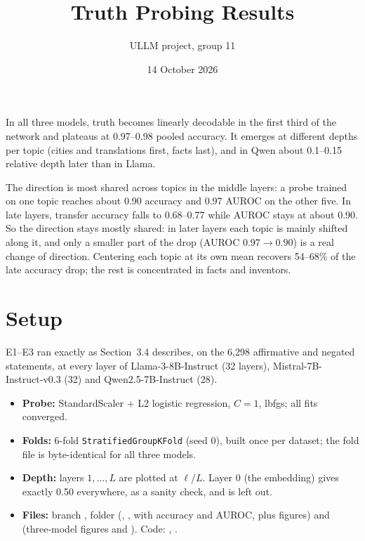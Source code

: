 \documentclass[11pt]{article}
\title{Truth Probing Results}
\author{ULLM project, group 11}
\date{14 October 2026}
\begin{document}
\maketitle

In all three models, truth becomes linearly decodable in the first third of the
network and plateaus at 0.97--0.98 pooled accuracy. It emerges at different depths per
topic (cities and translations first, facts last), and in Qwen about 0.1--0.15 relative
depth later than in Llama.

The direction is most shared across topics in the middle layers: a probe trained on one
topic reaches about 0.90 accuracy and 0.97 AUROC on the other five. In late layers,
transfer accuracy falls to 0.68--0.77 while AUROC stays at about 0.90. So the direction
stays mostly shared: in later layers each topic is mainly shifted along it, and only a
smaller part of the drop (AUROC $0.97 \rightarrow 0.90$) is a real change of direction.
Centering each topic at its own mean recovers 54--68\% of the late accuracy drop; the
rest is concentrated in facts and inventors.

\section{Setup}

E1--E3 ran exactly as Section~3.4 describes, on the 6,298 affirmative and negated
statements, at every layer of Llama-3-8B-Instruct (32 layers), Mistral-7B-Instruct-v0.3
(32) and Qwen2.5-7B-Instruct (28).

\begin{itemize}
  \item \textbf{Probe:} StandardScaler + L2 logistic regression, $C = 1$, lbfgs; all
        fits converged.
  \item \textbf{Folds:} 6-fold \texttt{StratifiedGroupKFold} (seed 0), built once per
        dataset; the fold file is byte-identical for all three models.
  \item \textbf{Depth:} layers $1, \dots, L$ are plotted at $\ell/L$. Layer 0 (the
        embedding) gives exactly 0.50 everywhere, as a sanity check, and is left out.
  \item \textbf{Files:} branch , folder
         (, ,
         with accuracy and AUROC, plus figures) and
         (three-model figures and
        ). Code: ,
        .
\end{itemize}
\end{document}
